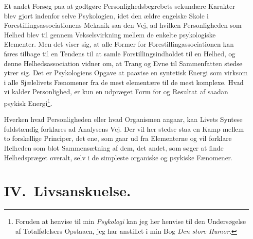 \documentclass[12pt]{article}
\begin{document}
Et andet Forsøg paa at godtgøre Personlighedsbegrebets sekundære
Karakter blev gjort indenfor selve Psykologien, idet den ældre
engelske Skole i Forestillingsassociationens Mekanik saa den Vej, ad
hvilken Personligheden som Helhed blev til gennem Vekselsvirkning
mellem de enkelte psykologiske Elementer. Men det viser sig, at alle
Former for
Forestillingassociationen kan føres tilbage til en Tendens til at samle
Forstillingsindholdet til en Helhed, og denne Helhedsassociation
vidner om, at Trang og Evne til Sammenfatten stedse ytrer sig. Det er
Psykologiens Opgave at paavise en syntetisk Energi som virksom i alle
Sjælelivets Fænomener fra de mest elementære til de mest komplexe.
Hvad vi kalder Personlighed, er kun en udpræget Form for og Resultat
af saadan psykisk Energi\footnote{Foruden at henvise til min
\textit{Psykologi} kan jeg her henvise til den Undersøgelse af
\guillemotright{}Totalfølelsers\guillemotleft{} Opstaaen, jeg har
anstillet i min Bog \textit{Den store Humor}.}.

Hverken hvad Personligheden eller hvad Organismen angaar, kan Livets
Syntese fuldstændig forklares ad Analysens Vej. Der vil her stedse
staa en Kamp mellem to forskellige Principer, det ene, som gaar ud fra
Elementerne og vil forklare Helheden som blot Sammensætning af dem,
det andet, som søger at finde Helhedspræget overalt, selv i de
simpleste organiske og psykiske Fænomener.

\section*{IV.\ Livsanskuelse.}
\end{document}
